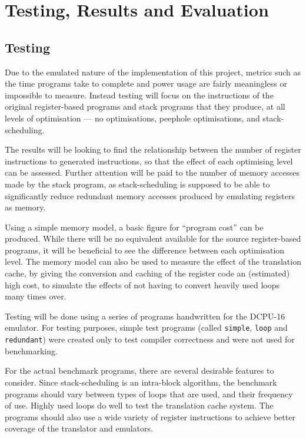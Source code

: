 \chapter{Testing, Results and Evaluation}\label{ch:testingresults}
\section{Testing}
Due to the emulated nature of the implementation of this project, metrics such
as the time programs take to complete and power usage are fairly meaningless or
impossible to measure. Instead testing will focus on the instructions of the
original register-based programs and stack programs that they produce, at all
levels of optimisation --- no optimisations, peephole optimisations, and
stack-scheduling.

The results will be looking to find the relationship between the number of
register instructions to generated instructions, so that the effect of each
optimising level can be assessed. Further attention will be paid to the number
of memory accesses made by the stack program, as stack-scheduling is supposed to
be able to significantly reduce redundant memory accesses produced by emulating
registers as memory.

Using a simple memory model, a basic figure for ``program cost'' can be
produced. While there will be no equivalent available for the source
register-based programs, it will be beneficial to see the difference between
each optimisation level. The memory model can also be used to measure the effect
of the translation cache, by giving the conversion and caching of the register
code an (estimated) high cost, to simulate the effects of not having to
convert heavily used loops many times over.

Testing will be done using a series of programs handwritten for the DCPU-16
emulator. For testing purposes, simple test programs (called \texttt{simple},
\texttt{loop} and \texttt{redundant}) were created only to test compiler
correctness and were not used for benchmarking.

For the actual benchmark programs, there are several desirable features to
consider. Since stack-scheduling is an intra-block algorithm, the benchmark
programs should vary between types of loops that are used, and their frequency
of use. Highly used loops do well to test the translation cache system. The
programs should also use a wide variety of register instructions to achieve
better coverage of the translator and emulators.

